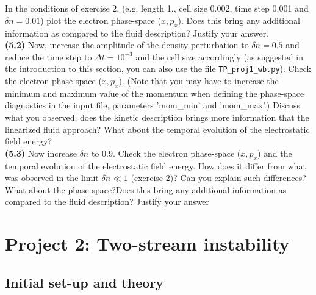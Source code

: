 \documentclass[11pt,a4paper]{article}
\begin{document}
$ $\\
\\
  In the conditions of exercise 2, (e.g. length 1., cell size 0.002, time step 0.001 and $\delta n = 0.01$) plot the electron phase-space ($x,p_x$). Does this bring any additional information as compared to the fluid description? Justify your answer.\\
{\bf (5.2)} Now, increase the amplitude of the density perturbation to $\delta n = 0.5$ and reduce the time step to $\Delta t =  10^{-3}$ and the cell size accordingly (as suggested in the introduction to this section, you can also use the file \texttt{TP\_proj1\_wb.py}). Check  the electron phase-space ($x,p_x$). (Note that you may have to increase the minimum and maximum value of the momentum when defining the phase-space diagnostics in the input file, parameters 'mom\_min' and 'mom\_max'.) Discuss what you observed: does the kinetic description brings more information that the linearized fluid approach? What about the temporal evolution of the electrostatic field energy?\\
{\bf (5.3)} Now increase $\delta n$ to 0.9. Check the  electron phase-space ($x,p_x$) and the temporal evolution of the electrostatic field energy. How does it differ from what was observed in the limit $\delta n \ll 1$ (exercise 2)? Can you explain such differences? What about the phase-space?Does this bring any additional information as compared to the fluid description? Justify your answer\\


\newpage
\section*{Project 2: Two-stream instability}\label{proj2}

\subsection*{Initial set-up and theory}
\end{document}
